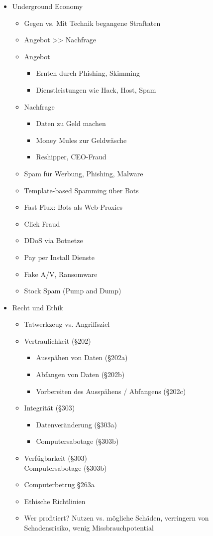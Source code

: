 \documentclass[11pt, paper=a4, twocolumn]{scrartcl}
\begin{document}
\begin{itemize}
		\item Underground Economy
			\begin{itemize}
				\item Gegen vs. Mit Technik begangene Straftaten
				\item Angebot >> Nachfrage
				\item Angebot
					\begin{itemize}
						\item Ernten durch Phishing, Skimming
						\item Dienstleistungen wie Hack, Host, 
							Spam
					\end{itemize}
				\item Nachfrage
					\begin{itemize}
						\item Daten zu Geld machen
						\item Money Mules zur Geldwäsche
						\item Reshipper, CEO-Fraud
					\end{itemize}
				\item Spam für Werbung, Phishing, Malware
				\item Template-based Spamming über Bots
				\item Fast Flux: Bots als Web-Proxies
				\item Click Fraud
				\item DDoS via Botnetze
				\item Pay per Install Dienste
				\item Fake A/V, Ransomware
				\item Stock Spam (Pump and Dump)
			\end{itemize}

		\item Recht und Ethik
			\begin{itemize}
				\item Tatwerkzeug vs. Angriffsziel
				\item Vertraulichkeit (§202)
					\begin{itemize}
						\item Ausspähen von Daten (§202a)
						\item Abfangen von Daten (§202b)
						\item Vorbereiten des Ausspähens / 
							Abfangens (§202c)
					\end{itemize}
				\item Integrität (§303)
					\begin{itemize}
						\item Datenveränderung (§303a)
						\item Computersabotage (§303b)
					\end{itemize}
				\item Verfügbarkeit (§303)\\
					Computersabotage (§303b)
				\item Computerbetrug §263a
				\item Ethische Richtlinien
				\item Wer profitiert? Nutzen vs. mögliche Schäden, 
					verringern von Schadensrisiko, wenig 
					Missbrauchpotential
			\end{itemize}
	\end{itemize}
\end{document}
